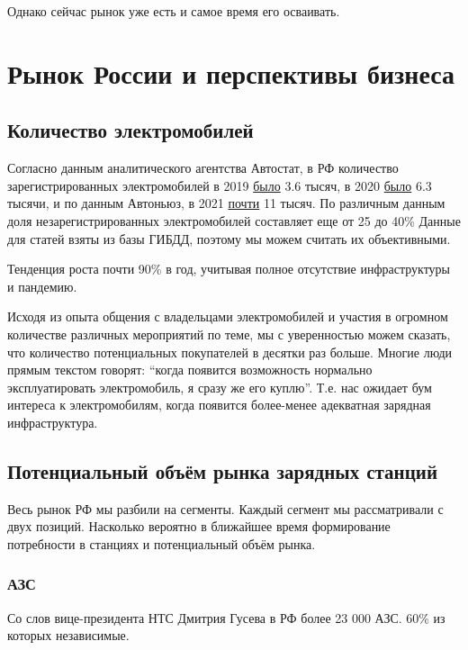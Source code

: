 \documentclass[a4paper,12pt]{report}
\begin{document}
Однако сейчас рынок уже есть и самое время его осваивать.  


\chapter{Рынок России и перспективы бизнеса}

\section{Количество электромобилей}

Согласно данным аналитического агентства Автостат, в РФ количество зарегистрированных электромобилей в 2019 \href{https://www.autostat.ru/news/38371/}{было} 3.6 тысяч, в 2020 \href{https://www.autostat.ru/news/42999/}{было} 6.3 тысячи, и по данным Автоньюз, в 2021 \href{https://www.autonews.ru/news/602002889a7947acbb3fd189}{почти} 11 тысяч. По различным данным доля незарегистрированных электромобилей составляет еще от 25 до 40\% Данные для статей взяты из базы ГИБДД, поэтому мы можем считать их объективными. 

Тенденция роста почти 90\% в год, учитывая полное отсутствие инфраструктуры и пандемию.

Исходя из опыта общения с владельцами электромобилей и участия в огромном количестве различных мероприятий по теме, мы с уверенностью можем сказать, что количество потенциальных покупателей в десятки раз больше. Многие люди прямым текстом говорят: “когда появится возможность нормально эксплуатировать электромобиль, я сразу же его куплю”. Т.е. нас ожидает бум интереса к электромобилям, когда появится более-менее адекватная зарядная инфраструктура. 

\section{Потенциальный объём рынка зарядных станций}

Весь рынок РФ мы разбили на сегменты. Каждый сегмент мы рассматривали с двух позиций. Насколько вероятно в ближайшее время формирование потребности в станциях и потенциальный объём рынка. 

\subsection{АЗС}

Со слов вице-президента НТС Дмитрия Гусева в РФ более 23 000 АЗС. 60\% из которых независимые. 
\end{document}
